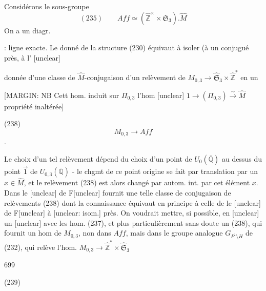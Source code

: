 Considérons le sous-groupe
$$ (235) \qquad Aff \simeq (\hat{\mathbb{Z}}^\times \times \mathfrak{S}_3) . \hat{M} $$
On a un diagr.


: ligne exacte. Le donné de la structure
(230) équivaut à isoler (à un conjugué près, à l' [unclear]

\newpage


donnée d'une classe de $\widehat{M}$-conjugaison d'un
relèvement de $M_{0,3} \to \widehat{\mathfrak{S}}_3 \times \hat{\mathbb{Z}}^*$ en un

[MARGIN: NB Cett hom. induit sur $\Pi_{0,3}$ l'hom [unclear] $1 \to (\Pi_{0,3}) \xrightarrow{\sim} \widehat{M}$ propriété inaltérée]

(238) $$M_{0,3} \longrightarrow Aff$$ .

Le choix d'un tel relèvement dépend du
choix d'un point de $U_0(\overline{\mathbb{Q}})$ au dessus du
point $\vec{1}$ de $U_{0,3}(\overline{\mathbb{Q}})$ - le chgmt de ce
point origine se fait par translation par un
$x \in \widehat{M}$, et le relèvement (238) est alors
changé par autom. int. par cet élément $x$.
Dans le [unclear] de F[unclear] fournit une
telle classe de conjugaison de relèvements (238)
dont la connaissance équivaut en principe
à celle de le [unclear] de F[unclear] à [unclear: isom.]
près. On voudrait mettre, si possible,
en [unclear] un [unclear] avec
les hom. (237), et plus particulièrement
sans doute un (238), qui fournit un
hom de $M_{0,3}$, non dans $Aff$, mais
dans le groupe analogue $G_{P^1 \setminus H}$
de (232), qui relève l'hom. $M_{0,3} \to \hat{\mathbb{Z}}^* \times \widehat{\mathfrak{S}}_3$

\newpage


699

(239)

